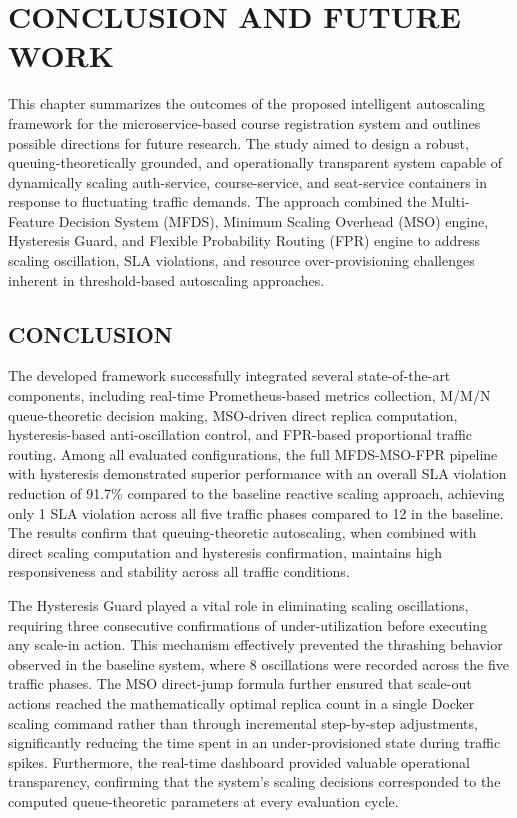 \chapter{CONCLUSION AND FUTURE WORK}

This chapter summarizes the outcomes of the proposed intelligent 
autoscaling framework for the microservice-based course registration 
system and outlines possible directions for future research. The 
study aimed to design a robust, queuing-theoretically grounded, and 
operationally transparent system capable of dynamically scaling 
auth-service, course-service, and seat-service containers in response 
to fluctuating traffic demands. The approach combined the 
Multi-Feature Decision System (MFDS), Minimum Scaling Overhead (MSO) 
engine, Hysteresis Guard, and Flexible Probability Routing (FPR) 
engine to address scaling oscillation, SLA violations, and resource 
over-provisioning challenges inherent in threshold-based autoscaling 
approaches.

\section{\uppercase{Conclusion}}

The developed framework successfully integrated several 
state-of-the-art components, including real-time Prometheus-based 
metrics collection, M/M/N queue-theoretic decision making, 
MSO-driven direct replica computation, hysteresis-based 
anti-oscillation control, and FPR-based proportional traffic 
routing. Among all evaluated configurations, the full 
MFDS-MSO-FPR pipeline with hysteresis demonstrated superior 
performance with an overall SLA violation reduction of 91.7\% 
compared to the baseline reactive scaling approach, achieving 
only 1 SLA violation across all five traffic phases compared to 
12 in the baseline. The results confirm that queuing-theoretic 
autoscaling, when combined with direct scaling computation and 
hysteresis confirmation, maintains high responsiveness and 
stability across all traffic conditions.

The Hysteresis Guard played a vital role in eliminating scaling 
oscillations, requiring three consecutive confirmations of 
under-utilization before executing any scale-in action. This 
mechanism effectively prevented the thrashing behavior observed 
in the baseline system, where 8 oscillations were recorded across 
the five traffic phases. The MSO direct-jump formula further 
ensured that scale-out actions reached the mathematically optimal 
replica count in a single Docker scaling command rather than 
through incremental step-by-step adjustments, significantly 
reducing the time spent in an under-provisioned state during 
traffic spikes. Furthermore, the real-time dashboard provided 
valuable operational transparency, confirming that the system's 
scaling decisions corresponded to the computed queue-theoretic 
parameters at every evaluation cycle.


